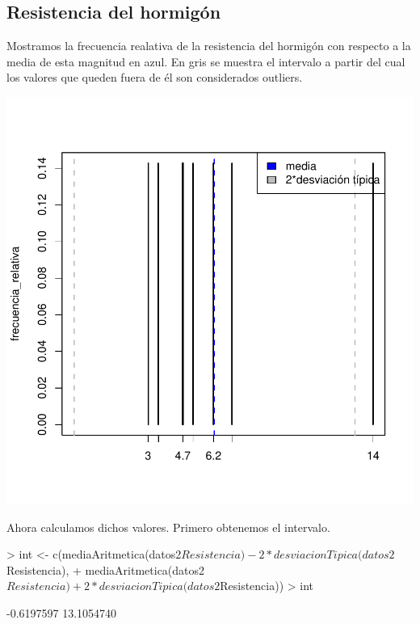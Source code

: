 \documentclass [a4paper] {article}
\begin{document}
\subsection{Resistencia del hormigón}
Mostramos la frecuencia realativa de la resistencia del hormigón con respecto a la media de esta magnitud en azul.
En gris se muestra el intervalo a partir del cual los valores que queden fuera de él son considerados outliers.
\begin{center}
\begin{Schunk}
\end{Schunk}
\includegraphics{entrega-desviacion_tipica_resistencia_plot}
\end{center}
Ahora calculamos dichos valores.
Primero obtenemos el intervalo.
\begin{Schunk}
\begin{Sinput}
> int <- c(mediaAritmetica(datos2$Resistencia) - 2*desviacionTipica(datos2$Resistencia), 
+          mediaAritmetica(datos2$Resistencia) + 2*desviacionTipica(datos2$Resistencia))
> int
\end{Sinput}
\begin{Soutput}
[1] -0.6197597 13.1054740
\end{Soutput}
\end{Schunk}
\end{document}
